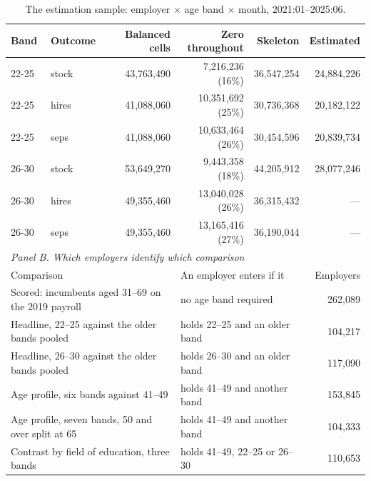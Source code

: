 \begin{table}[ht!]
\centering
\footnotesize
\caption{The estimation sample: employer $\times$ age band $\times$ month, 2021:01--2025:06.}
\label{tab:sumstats_employment_new}
\begin{tabular}{llrrrr}
\toprule
Band & Outcome & Balanced cells & Zero throughout & Skeleton & Estimated \\
\midrule
22-25 & stock & 43,763,490 & 7,216,236 (16\%) & 36,547,254 & 24,884,226 \\
22-25 & hires & 41,088,060 & 10,351,692 (25\%) & 30,736,368 & 20,182,122 \\
22-25 & seps & 41,088,060 & 10,633,464 (26\%) & 30,454,596 & 20,839,734 \\
26-30 & stock & 53,649,270 & 9,443,358 (18\%) & 44,205,912 & 28,077,246 \\
26-30 & hires & 49,355,460 & 13,040,028 (26\%) & 36,315,432 & --- \\
26-30 & seps & 49,355,460 & 13,165,416 (27\%) & 36,190,044 & --- \\
\midrule
\multicolumn{6}{l}{\textit{Panel B. Which employers identify which comparison}} \\
\multicolumn{3}{l}{Comparison} & \multicolumn{2}{l}{An employer enters if it} & Employers \\
\multicolumn{3}{l}{Scored: incumbents aged 31--69 on the 2019 payroll} & \multicolumn{2}{l}{no age band required} & 262,089 \\
\multicolumn{3}{l}{Headline, 22--25 against the older bands pooled} & \multicolumn{2}{l}{holds 22--25 and an older band} & 104,217 \\
\multicolumn{3}{l}{Headline, 26--30 against the older bands pooled} & \multicolumn{2}{l}{holds 26--30 and an older band} & 117,090 \\
\multicolumn{3}{l}{Age profile, six bands against 41--49} & \multicolumn{2}{l}{holds 41--49 and another band} & 153,845 \\
\multicolumn{3}{l}{Age profile, seven bands, 50 and over split at 65} & \multicolumn{2}{l}{holds 41--49 and another band} & 104,333 \\
\multicolumn{3}{l}{Contrast by field of education, three bands} & \multicolumn{2}{l}{holds 41--49, 22--25 or 26--30} & 110,653 \\
\bottomrule
\end{tabular}

\end{table}
